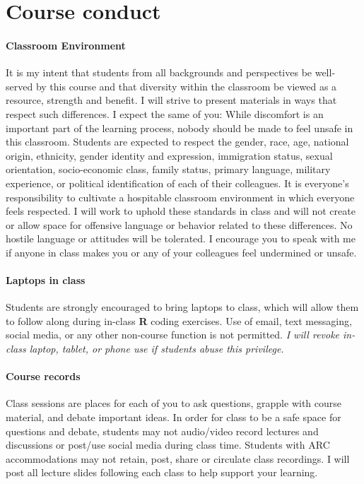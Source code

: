 \documentclass[11pt]{article}
\begin{document}
\section*{Course conduct}

\paragraph{Classroom Environment} It is my intent that students from all backgrounds and perspectives be well-served by this course and that diversity within the classroom be viewed as a resource, strength and benefit. I will strive to present materials in ways that respect such differences. I expect the same of you: While discomfort is an important part of the learning process, nobody should be made to feel unsafe in this classroom. Students are expected to respect the gender, race, age, national origin, ethnicity, gender identity and expression, immigration status, sexual orientation, socio-economic class, family status, primary language, military experience, or political identification of each of their colleagues. It is everyone’s responsibility to cultivate a hospitable classroom environment in which everyone feels respected. I will work to uphold these standards in class and will not create or allow space for offensive language or behavior related to these differences. No hostile language or attitudes will be tolerated. I encourage you to speak with me if anyone in class makes you or any of your colleagues feel undermined or unsafe. 


\paragraph{Laptops in class} Students are strongly encouraged to bring laptops to class, which will allow them to follow along during in-class \textbf{\textsf{R}} coding exercises. Use of email, text messaging, social media, or any other non-course function is not permitted. \textit{I will revoke in-class laptop, tablet, or phone use if students abuse this privilege.} 

\paragraph{Course records} Class sessions are places for each of you to ask questions, grapple with course material, and debate important ideas. In order for class to be a safe space for questions and debate, students may not audio/video record lectures and discussions or post/use social media during class time. Students with ARC accommodations may not retain, post, share or circulate class recordings. I will post all lecture slides following each class to help support your learning. \vspace{-5pt}
\end{document}

